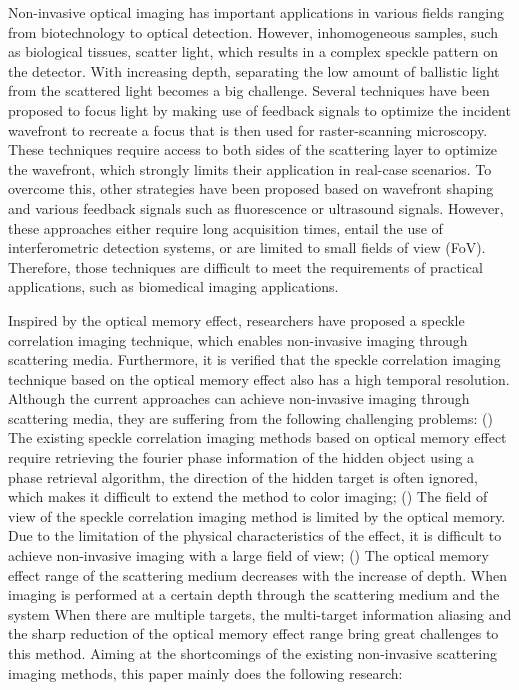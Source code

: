 \begin{englishabstract}
Non-invasive optical imaging has important applications in various fields ranging from biotechnology to optical detection. However, inhomogeneous samples, such as biological tissues, scatter light, which results in a complex speckle pattern on the detector. With increasing depth, separating the low amount of ballistic light from the scattered light becomes a big challenge.  Several techniques have been proposed to focus light by making use of feedback signals to optimize the incident wavefront to recreate a focus that is then used for raster-scanning microscopy. These techniques require access to both sides of the scattering layer to optimize the wavefront, which strongly limits their application in real-case scenarios. To overcome this, other strategies have been proposed based on wavefront shaping and various feedback signals such as fluorescence or ultrasound signals. However, these approaches either require long acquisition times, entail the use of interferometric detection systems, or are limited to small fields of view (FoV). Therefore, those techniques are difficult to meet the requirements of practical applications, such as biomedical imaging applications.

Inspired by the optical memory effect, researchers have proposed a speckle correlation imaging technique, which enables non-invasive imaging through scattering media. Furthermore, it is verified that the speckle correlation imaging technique based on the optical memory effect also has a high temporal resolution. Although the current approaches can achieve non-invasive imaging through scattering media, they are suffering from the following challenging problems: () The existing speckle correlation imaging methods based on optical memory effect require retrieving the fourier phase information of the hidden object using a phase retrieval algorithm, the direction of the hidden target is often ignored, which makes it difficult to extend the method to color imaging; () The field of view of the speckle correlation imaging method is limited by the optical memory. Due to the limitation of the physical characteristics of the effect, it is difficult to achieve non-invasive imaging with a large field of view; () The optical memory effect range of the scattering medium decreases with the increase of depth. When imaging is performed at a certain depth through the scattering medium and the system When there are multiple targets, the multi-target information aliasing and the sharp reduction of the optical memory effect range bring great challenges to this method. Aiming at the shortcomings of the existing non-invasive scattering imaging methods, this paper mainly does the following research:


\end{englishabstract}
